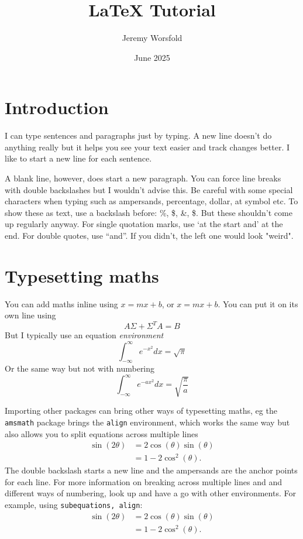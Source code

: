 \documentclass[11pt, a4paper, twocolumn]{article}
\title{LaTeX Tutorial}
\author{Jeremy Worsfold}
\date{June 2025}
\begin{document}
\maketitle

\section{Introduction}

I can type sentences and paragraphs just by typing.
A new line doesn't do anything really but it helps you see your text easier and track changes better.
I like to start a new line for each sentence.

A blank line, however, does start a new paragraph. You can force line breaks with double backslashes but I wouldn't advise this. 
Be careful with some special characters when typing such as ampersands, percentage, dollar, at symbol etc. To show these as text, use a backslash before: \%, \$, \&, \$. But these shouldn't come up regularly anyway.
For single quotation marks, use `at the start and' at the end. For double quotes, use ``and''. 
If you didn't, the left one would look "weird".


\section{Typesetting maths}

You can add maths inline using $x=mx + b$, or \(x=mx+b\). You can put it on its own line using 
\[
    A\Sigma + \Sigma^T A = B
\]
But I typically use an equation \textit{environment}
\begin{equation}
    \int_{-\infty}^\infty e^{-x^2} d x = \sqrt{\pi}
\end{equation}
Or the same way but not with numbering
\begin{equation*}
    \int_{-\infty}^\infty e^{-ax^2} d x = \sqrt{\frac{\pi}{a}}
\end{equation*}

Importing other packages can bring other ways of typesetting maths, eg the \texttt{amsmath} package brings the \texttt{align} environment, which works the same way but also allows you to split equations across multiple lines
\begin{align}
    \sin(2\theta) & = 2\cos(\theta)\sin(\theta) \\
    & = 1-2\cos^2(\theta).
\end{align}
The double backslash starts a new line and the ampersands are the anchor points for each line.
For more information on breaking across multiple lines and and different ways of numbering, look up and have a go with other environments.
For example, using \texttt{subequations, align}:
\begin{subequations} %
\begin{align} %
    \sin(2\theta) & = 2\cos(\theta)\sin(\theta) \\
    & = 1-2\cos^2(\theta).
\end{align}
\end{subequations}
\end{document}
